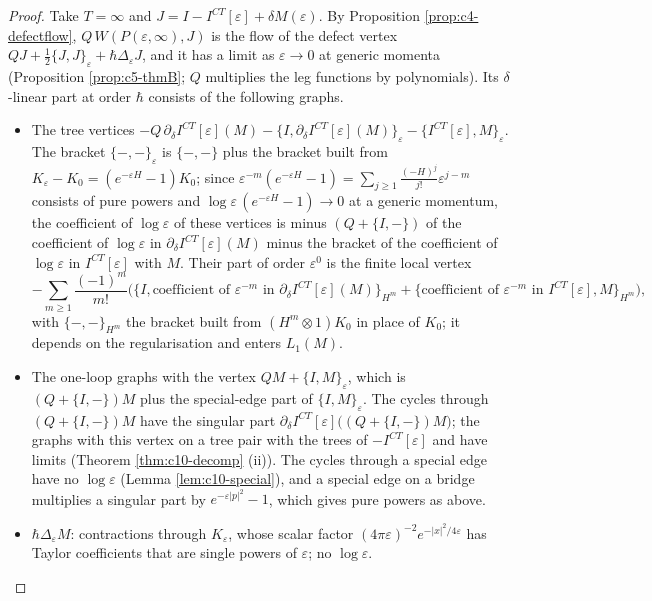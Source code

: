 \begin{proof}
Take $T=\infty$ and $J=I-I^{CT}[\varepsilon]+\delta M(\varepsilon)$. By Proposition \ref{prop:c4-defectflow}, $Q\,W(P(\varepsilon,\infty),J)$ is the flow of the defect vertex $QJ+\tfrac12\{J,J\}_\varepsilon+\hbar\Delta_\varepsilon J$, and it has a limit as $\varepsilon\to0$ at generic momenta (Proposition \ref{prop:c5-thmB}; $Q$ multiplies the leg functions by polynomials). Its $\delta$-linear part at order $\hbar$ consists of the following graphs.
\begin{itemize}
\item The tree vertices $-Q\,\partial_\delta I^{CT}[\varepsilon](M)-\{I,\partial_\delta I^{CT}[\varepsilon](M)\}_\varepsilon-\{I^{CT}[\varepsilon],M\}_\varepsilon$. The bracket $\{-,-\}_\varepsilon$ is $\{-,-\}$ plus the bracket built from $K_\varepsilon-K_0=(e^{-\varepsilon H}-1)K_0$; since $\varepsilon^{-m}(e^{-\varepsilon H}-1)=\sum_{j\ge1}\frac{(-H)^j}{j!}\varepsilon^{j-m}$ consists of pure powers and $\log\varepsilon\,(e^{-\varepsilon H}-1)\to0$ at a generic momentum, the coefficient of $\log\varepsilon$ of these vertices is minus $(Q+\{I,-\})$ of the coefficient of $\log\varepsilon$ in $\partial_\delta I^{CT}[\varepsilon](M)$ minus the bracket of the coefficient of $\log\varepsilon$ in $I^{CT}[\varepsilon]$ with $M$. Their part of order $\varepsilon^0$ is the finite local vertex
\begin{equation}
-\sum_{m\ge1}\frac{(-1)^m}{m!}\Big(\big\{I,\text{coefficient of }\varepsilon^{-m}\text{ in }\partial_\delta I^{CT}[\varepsilon](M)\big\}_{H^m}+\big\{\text{coefficient of }\varepsilon^{-m}\text{ in }I^{CT}[\varepsilon],M\big\}_{H^m}\Big),
\label{eq:c10-finitesp}
\end{equation}
with $\{-,-\}_{H^m}$ the bracket built from $(H^m\otimes1)K_0$ in place of $K_0$; it depends on the regularisation and enters $L_1(M)$.
\item The one-loop graphs with the vertex $QM+\{I,M\}_\varepsilon$, which is $(Q+\{I,-\})M$ plus the special-edge part of $\{I,M\}_\varepsilon$. The cycles through $(Q+\{I,-\})M$ have the singular part $\partial_\delta I^{CT}[\varepsilon]\big((Q+\{I,-\})M\big)$; the graphs with this vertex on a tree pair with the trees of $-I^{CT}[\varepsilon]$ and have limits (Theorem \ref{thm:c10-decomp} (ii)). The cycles through a special edge have no $\log\varepsilon$ (Lemma \ref{lem:c10-special}), and a special edge on a bridge multiplies a singular part by $e^{-\varepsilon|p|^2}-1$, which gives pure powers as above.
\item $\hbar\Delta_\varepsilon M$: contractions through $K_\varepsilon$, whose scalar factor $(4\pi\varepsilon)^{-2}e^{-|x|^2/4\varepsilon}$ has Taylor coefficients that are single powers of $\varepsilon$; no $\log\varepsilon$.

\end{itemize}
\end{proof}
